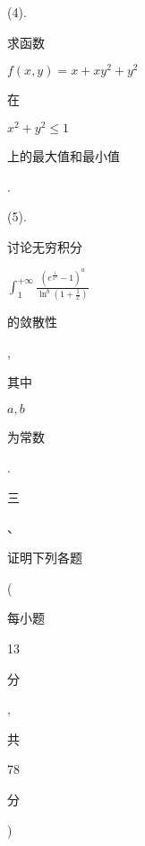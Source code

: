 \documentclass[10pt]{article}
\begin{document}
(4). \begin{CJK}{UTF8}{mj}求函数\end{CJK} $f(x, y)=x+x y^{2}+y^{2}$ \begin{CJK}{UTF8}{mj}在\end{CJK} $x^{2}+y^{2} \leqslant 1$ \begin{CJK}{UTF8}{mj}上的最大值和最小值\end{CJK}.

(5). \begin{CJK}{UTF8}{mj}讨论无穷积分\end{CJK} $\int_{1}^{+\infty} \frac{\left(e^{\frac{1}{x^{2}}}-1\right)^{a}}{\ln ^{b}\left(1+\frac{1}{x}\right)}$ \begin{CJK}{UTF8}{mj}的敛散性\end{CJK}, \begin{CJK}{UTF8}{mj}其中\end{CJK} $a, b$ \begin{CJK}{UTF8}{mj}为常数\end{CJK}.

\begin{CJK}{UTF8}{mj}三\end{CJK}、\begin{CJK}{UTF8}{mj}证明下列各题\end{CJK} (\begin{CJK}{UTF8}{mj}每小题\end{CJK} 13 \begin{CJK}{UTF8}{mj}分\end{CJK}, \begin{CJK}{UTF8}{mj}共\end{CJK} 78 \begin{CJK}{UTF8}{mj}分\end{CJK})
\end{document}
